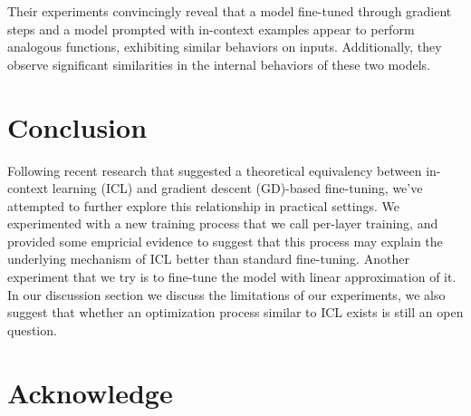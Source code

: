 \documentclass[11pt]{article}
\begin{document}
Their experiments convincingly reveal that a model fine-tuned through gradient steps and a model prompted with in-context examples appear to perform analogous functions, exhibiting similar behaviors on inputs.
Additionally, they observe significant similarities in the internal behaviors of these two models.




\section{Conclusion}
Following recent research that suggested a theoretical equivalency between in-context learning (ICL) and gradient descent (GD)-based fine-tuning, we've attempted to further explore this relationship in practical settings.
We experimented with a new training process that we call per-layer training,
and provided some empricial evidence to suggest that this process may explain the underlying mechanism of ICL better than standard fine-tuning.
Another experiment that we try is to fine-tune the model with linear approximation of it.
In our discussion section we discuss the limitations of our experiments, we also suggest that whether an optimization process similar to ICL exists is still an open question.
\section{Acknowledge}

\nocite{rw1}
\nocite{rw2}




\newpage
\appendix
\end{document}
